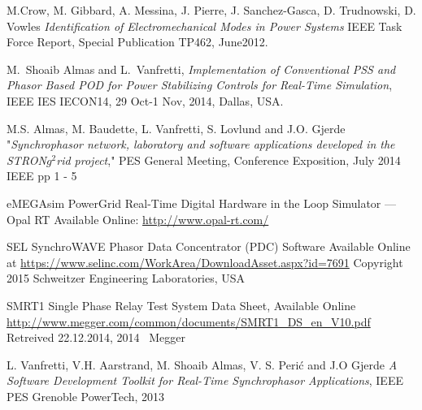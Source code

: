 \documentclass[conference]{IEEEtran}
\begin{document}
\begin{thebibliography}{1}
 M.Crow, M. Gibbard, A. Messina, J. Pierre, J. Sanchez-Gasca, D. Trudnowski, D. Vowles \emph{Identification of Electromechanical Modes in Power Systems} IEEE Task Force Report, Special Publication TP462, June2012.

 M.~Shoaib Almas and L.~Vanfretti, \emph{Implementation of Conventional PSS and Phasor Based POD for Power Stabilizing Controls for Real-Time Simulation}, IEEE IES IECON14, 29 Oct-1 Nov, 2014, Dallas, USA.

 M.S. Almas, M. Baudette, L. Vanfretti, S. Lovlund and J.O. Gjerde "\emph{Synchrophasor network, laboratory and software applications developed in the STRON$g^{2}$rid project}," PES General Meeting, Conference Exposition, July 2014 IEEE pp 1 - 5

 eMEGAsim PowerGrid Real-Time Digital Hardware in the Loop Simulator — Opal RT Available Online: \url{http://www.opal-rt.com/}

 SEL SynchroWAVE Phasor Data Concentrator (PDC) Software Available Online at \url{https://www.selinc.com/WorkArea/DownloadAsset.aspx?id=7691} Copyright 2015 Schweitzer Engineering Laboratories, USA

 SMRT1 Single Phase Relay Test System Data Sheet, Available Online \url{http://www.megger.com/common/documents/SMRT1_DS_en_V10.pdf} Retreived 22.12.2014, 2014 \textcopyright~Megger

 L. Vanfretti, V.H. Aarstrand, M. Shoaib Almas, V. S. Peri\'c and J.O Gjerde \emph{A Software Development Toolkit for Real-Time Synchrophasor Applications},  IEEE PES Grenoble PowerTech, 2013






\end{thebibliography}
\end{document}
